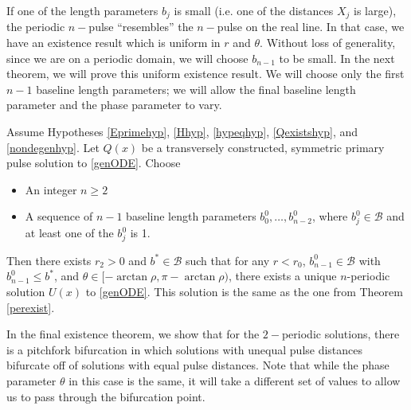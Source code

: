 \documentclass[thesis.tex]{subfiles}
\begin{document}
If one of the length parameters $b_j$ is small (i.e. one of the distances $X_j$ is large), the periodic $n-$pulse ``resembles'' the $n-$pulse on the real line. In that case, we have an existence result which is uniform in $r$ and $\theta$. Without loss of generality, since we are on a periodic domain, we will choose $b_{n-1}$ to be small. In the next theorem, we will prove this uniform existence result. We will choose only the first $n-1$ baseline length parameters; we will allow the final baseline length parameter and the phase parameter to vary. 

\begin{theorem}\label{unifperexist}
Assume Hypotheses \ref{Eprimehyp}, \ref{Hhyp}, \ref{hypeqhyp}, \ref{Qexistshyp}, and \ref{nondegenhyp}. Let $Q(x)$ be a transversely constructed, symmetric primary pulse solution to \eqref{genODE}. Choose
\begin{itemize}
\item An integer $n \geq 2$ 
\item A sequence of $n-1$ baseline length parameters $b_0^0, \dots, b_{n-2}^0$, where $b_j^0 \in \mathcal{B}$ and at least one of the $b_j^0$ is 1.
\end{itemize}
Then there exists $r_2 > 0$ and $b^* \in \mathcal{B}$ such that for any $r < r_0$, $b_{n-1}^0 \in \mathcal{B}$ with $b_{n-1}^0 \leq b^*$, and $\theta \in [-\arctan \rho, \pi - \arctan \rho)$, there exists a unique $n$-periodic solution $U(x)$ to \eqref{genODE}. This solution is the same as the one from Theorem \ref{perexist}.
\end{theorem}

In the final existence theorem, we show that for the $2-$periodic solutions, there is a pitchfork bifurcation in which solutions with unequal pulse distances bifurcate off of solutions with equal pulse distances. Note that while the phase parameter $\theta$ in this case is the same, it will take a different set of values to allow us to pass through the bifurcation point.
\end{document}
